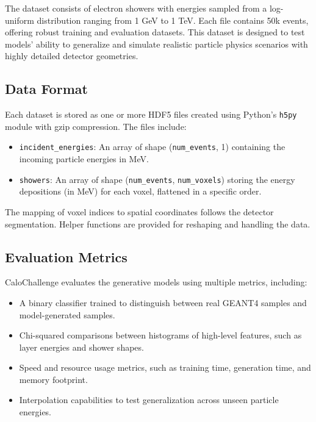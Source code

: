 The dataset consists of electron showers with energies sampled from a log-uniform distribution ranging from 1 GeV to 1 TeV. Each file contains 50k events, offering robust training and evaluation datasets. This dataset is designed to test models' ability to generalize and simulate realistic particle physics scenarios with highly detailed detector geometries.


\subsection{Data Format}

Each dataset is stored as one or more HDF5 files created using Python's \texttt{h5py} module with gzip compression. The files include:

\begin{itemize}
    \item \texttt{incident\_energies}: An array of shape (\texttt{num\_events}, 1) containing the incoming particle energies in MeV.
    \item \texttt{showers}: An array of shape (\texttt{num\_events}, \texttt{num\_voxels}) storing the energy depositions (in MeV) for each voxel, flattened in a specific order.
\end{itemize}

The mapping of voxel indices to spatial coordinates follows the detector segmentation. Helper functions are provided for reshaping and handling the data.

\subsection{Evaluation Metrics}

CaloChallenge evaluates the generative models using multiple metrics, including:

\begin{itemize}
    \item A binary classifier trained to distinguish between real GEANT4 samples and model-generated samples.
    \item Chi-squared comparisons between histograms of high-level features, such as layer energies and shower shapes.
    \item Speed and resource usage metrics, such as training time, generation time, and memory footprint.
    \item Interpolation capabilities to test generalization across unseen particle energies.
\end{itemize}

